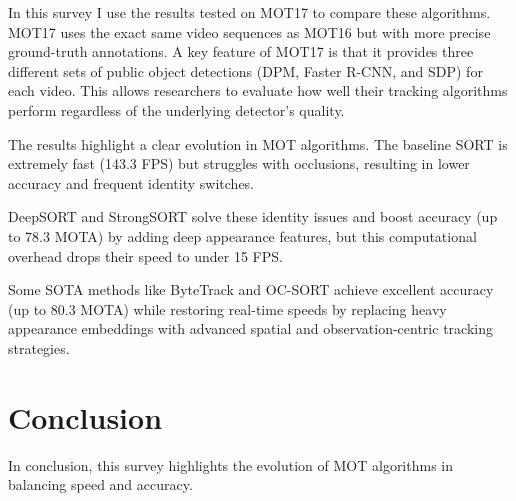 \documentclass[10pt,twocolumn,letterpaper]{article}
\begin{document}
In this survey I use the results tested on MOT17 to compare these algorithms. MOT17 uses the exact same video sequences as MOT16 but with more precise ground-truth annotations. A key feature of MOT17 is that it provides three different sets of public object detections (DPM, Faster R-CNN, and SDP) for each video. This allows researchers to evaluate how well their tracking algorithms perform regardless of the underlying detector's quality.
\begin{table}[H]
    \centering
    \caption{Performance comparison on the MOT17 test set (Private Detections). *OC-SORT FPS is evaluated purely on the association step.}
    \label{tab:mot_comparison}
\end{table}
The results highlight a clear evolution in MOT algorithms. The baseline SORT is extremely fast (143.3 FPS) but struggles with occlusions, resulting in lower accuracy and frequent identity switches. 

DeepSORT and StrongSORT solve these identity issues and boost accuracy (up to 78.3 MOTA) by adding deep appearance features, but this computational overhead drops their speed to under 15 FPS.

Some SOTA methods like ByteTrack and OC-SORT achieve excellent accuracy (up to 80.3 MOTA) while restoring real-time speeds by replacing heavy appearance embeddings with advanced spatial and observation-centric tracking strategies.
\section{Conclusion}
In conclusion, this survey highlights the evolution of MOT algorithms in balancing speed and accuracy. 
\end{document}
